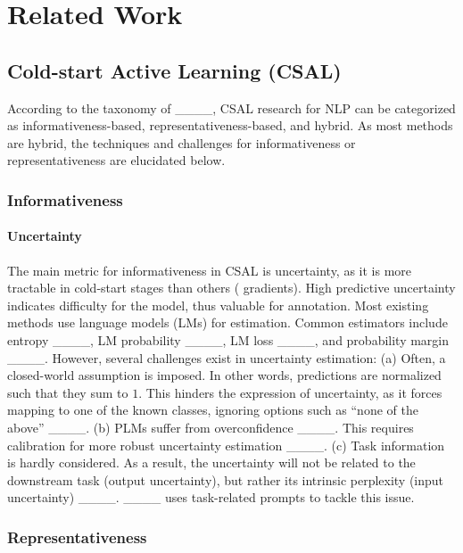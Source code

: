 \section{Related Work}
\label{sec:related-work}

\subsection{Cold-start Active Learning (CSAL)}
\label{sec:csal-taxonomy}

According to the taxonomy of ____, CSAL research for NLP can be categorized as informativeness-based, representativeness-based, and hybrid.
As most methods are hybrid, the techniques and challenges for informativeness or representativeness are elucidated below.

\subsubsection{Informativeness}
\label{subsubsec:informativeness}

\paragraph{Uncertainty}
The main metric for informativeness in CSAL is uncertainty, as it is more tractable in cold-start stages than others (\eg{} gradients).
High predictive uncertainty indicates difficulty for the model, thus valuable for annotation.
Most existing methods use language models (LMs) for estimation.
Common estimators include
entropy ____,
LM probability ____,
LM loss ____, and
probability margin ____.
However, several challenges exist in uncertainty estimation:
(a)
Often, a closed-world assumption is imposed.
In other words, predictions are normalized such that they sum to $1$.
This hinders the expression of uncertainty, as it forces mapping to one of the known classes, ignoring options such as ``none of the above'' ____.
(b) PLMs suffer from overconfidence ____.
This requires calibration for more robust uncertainty estimation ____.
(c)
Task information is hardly considered.
As a result, the uncertainty will not be related to the downstream task (output uncertainty), but rather its intrinsic perplexity (input uncertainty) ____.
\patron{} ____ uses task-related prompts to tackle this issue.

\subsubsection{Representativeness}
\label{subsubsec:repr}


